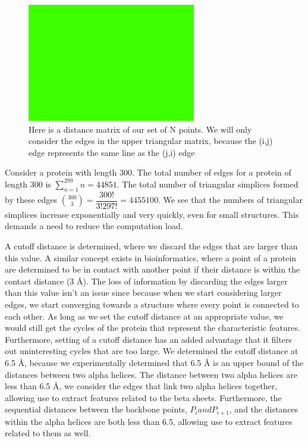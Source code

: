 \documentclass[12pt, a4paper, twocolumn, fullpage]{article}
\theoremstyle{plain}
\theoremstyle{definition}
\theoremstyle{remark}
\begin{document}
\begin{figure}[t]
    \includegraphics[width=\linewidth]{img/blank.png}
    \caption{Here is a distance matrix of our set of N points. We will only consider the edges in the upper triangular matrix, because the (i,j) edge represents the same line as the (j,i) edge}
    \label{Distance matrix of example}
\end{figure}

Consider a protein with length 300. The total number of edges for a protein of length 300 is $\sum_{n=1}^{299} n =44851$. The total number of triangular simplices formed by these edges $\binom{300}{3}=\dfrac{300!}{3!297!}=4455100$.  We see that the numbers of triangular simplices increase exponentially and very quickly, even for small structures. This demands a need to reduce the computation load.

A cutoff distance is determined, where we discard the edges that are larger than this value. A similar concept exists in bioinformatics, where a point of a protein are determined to be in contact with another point if their distance is within the contact distance (3 Å). The loss of information by discarding the edges larger than this value isn't an issue since because when we start considering larger edges, we start converging towards a structure where every point is connected to each other. As long as we set the cutoff distance at an appropriate value, we would still get the cycles of the protein that represent the characteristic features. Furthermore, setting of a cutoff distance has an added advantage that it filters out uninteresting cycles that are too large. We determined the cutoff distance at 6.5 Å, because we experimentally determined that 6.5 Å is an upper bound of the distances between two alpha helices. The distance between two alpha helices are less than 6.5  Å, we  consider the edges that link two alpha helices together, allowing use to extract features related to the beta sheets. Furthermore, the sequential distances between the backbone points, $P_i and P_{i+1}$, and the distances within the alpha helices are both less than 6.5, allowing use to extract features related to them as well.
\end{document}
